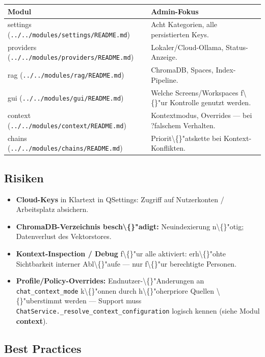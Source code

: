 \begin{center}
\begin{tabular}{ll}
\hline
Modul & Admin-Fokus \\
\hline
settings (\texttt{../../modules/settings/README.md}) & Acht Kategorien, alle persistierten Keys. \\
providers (\texttt{../../modules/providers/README.md}) & Lokaler/Cloud-Ollama, Status-Anzeige. \\
rag (\texttt{../../modules/rag/README.md}) & ChromaDB, Spaces, Index-Pipeline. \\
gui (\texttt{../../modules/gui/README.md}) & Welche Screens/Workspaces f\textbackslash\{\}"ur Kontrolle genutzt werden. \\
context (\texttt{../../modules/context/README.md}) & Kontextmodus, Overrides --- bei ?falschem\texttt{} Verhalten. \\
chains (\texttt{../../modules/chains/README.md}) & Priorit\textbackslash\{\}"atskette bei Kontext-Konflikten. \\
\hline
\end{tabular}
\end{center}

\subsection{Risiken}

\begin{itemize}
\item \textbf{Cloud-Keys} in Klartext in QSettings: Zugriff auf Nutzerkonten / Arbeitsplatz absichern.
\item \textbf{ChromaDB-Verzeichnis besch\textbackslash\{\}"adigt:} Neuindexierung n\textbackslash\{\}"otig; Datenverlust des Vektorstores.
\item \textbf{Kontext-Inspection / Debug} f\textbackslash\{\}"ur alle aktiviert: erh\textbackslash\{\}"ohte Sichtbarkeit interner Abl\textbackslash\{\}"aufe --- nur f\textbackslash\{\}"ur berechtigte Personen.
\item \textbf{Profile/Policy-Overrides:} Endnutzer-\textbackslash\{\}"Anderungen an \texttt{chat\_context\_mode} k\textbackslash\{\}"onnen durch h\textbackslash\{\}"oherpriore Quellen \textbackslash\{\}"uberstimmt werden --- Support muss \texttt{ChatService.\_resolve\_context\_configuration} logisch kennen (siehe Modul \textbf{context}).
\end{itemize}

\subsection{Best Practices}

